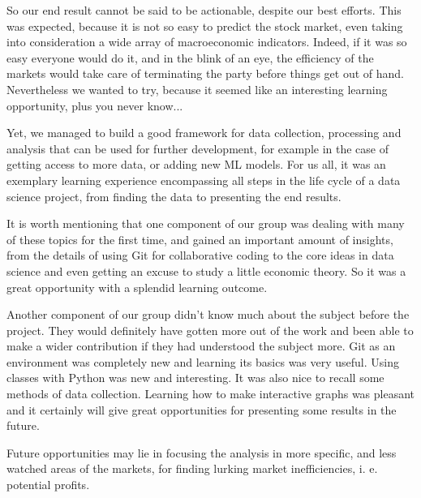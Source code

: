 \documentclass[10pt]{article} %
\begin{document}
So our end result cannot be said to be actionable, despite our best efforts. This was expected, because it is not so easy to predict the stock market, even taking into consideration a wide array of macroeconomic indicators. Indeed, if it was so easy everyone would do it, and in the blink of an eye, the efficiency of the markets would take care of terminating the party before things get out of hand. Nevertheless we wanted to try, because it seemed like an interesting learning opportunity, plus you never know...

Yet, we managed to build a good framework for data collection, processing and analysis that can be used for further development, for example in the case of getting access to more data, or adding new ML models. For us all, it was an exemplary learning experience encompassing all steps in the life cycle of a data science project, from finding the data to presenting the end results.

It is worth mentioning that one component of our group was dealing with many of these topics for the first time, and gained an important amount of insights, from the details of using Git for collaborative coding to the core ideas in data science and even getting an excuse to study a little economic theory. So it was a great opportunity with a splendid learning outcome.

Another component of our group didn't know much about the subject before the project. They would definitely have gotten more out of the work and been able to make a wider contribution if they had understood the subject more. Git as an environment was completely new and learning its basics was very useful. Using classes with Python was new and interesting. It was also nice to recall some methods of data collection. Learning how to make interactive graphs was pleasant and it certainly will give great opportunities for presenting some results in the future.

Future opportunities may lie in focusing the analysis in more specific, and less watched areas of the markets, for finding lurking market inefficiencies, i. e. potential profits.
\end{document}
